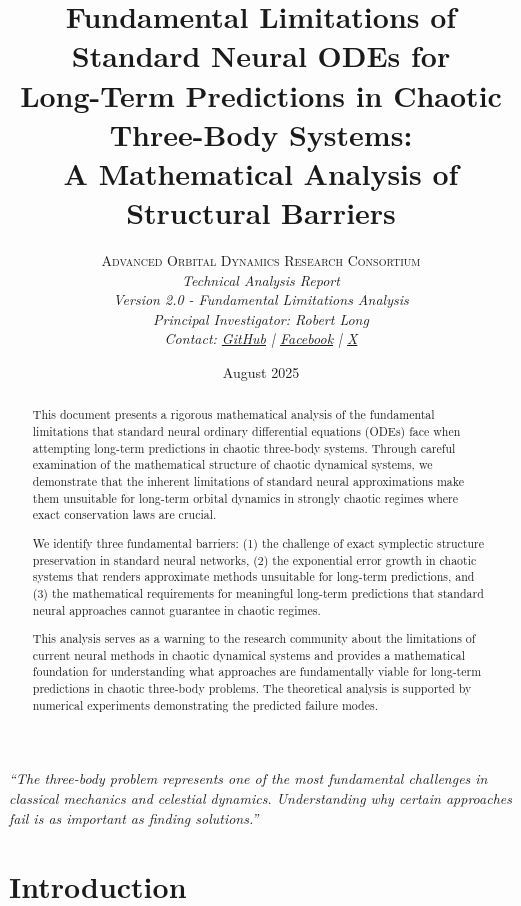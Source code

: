 \documentclass[11pt,a4paper]{article}
\title{
    \vspace{-2cm}
    \Huge\textbf{Fundamental Limitations of Standard Neural ODEs for}\\
    \Huge\textbf{Long-Term Predictions in Chaotic Three-Body Systems:}\\
    \Large\textbf{A Mathematical Analysis of Structural Barriers}\\
    \vspace{1cm}
}
\author{
    \large\textsc{Advanced Orbital Dynamics Research Consortium}\\
    \vspace{0.5cm}
    \normalsize\textit{Technical Analysis Report}\\
    \normalsize\textit{Version 2.0 - Fundamental Limitations Analysis}\\
    \vspace{0.3cm}
    \normalsize\textit{Principal Investigator: Robert Long}\\
    \vspace{0.2cm}
    \normalsize\textit{Contact: \href{https://github.com/Bigrob7605}{GitHub} | \href{https://www.facebook.com/SillyDaddy7605}{Facebook} | \href{https://x.com/LookDeepSonSon}{X}}
}
\date{August 2025}
\begin{document}
\maketitle
\thispagestyle{empty}

\vfill
\begin{center}
    \textit{``The three-body problem represents one of the most fundamental challenges in classical mechanics and celestial dynamics. Understanding why certain approaches fail is as important as finding solutions.''}
\end{center}
\vfill

\newpage

\tableofcontents
\newpage

\begin{abstract}
This document presents a rigorous mathematical analysis of the fundamental limitations that standard neural ordinary differential equations (ODEs) face when attempting long-term predictions in chaotic three-body systems. Through careful examination of the mathematical structure of chaotic dynamical systems, we demonstrate that the inherent limitations of standard neural approximations make them unsuitable for long-term orbital dynamics in strongly chaotic regimes where exact conservation laws are crucial.

We identify three fundamental barriers: (1) the challenge of exact symplectic structure preservation in standard neural networks, (2) the exponential error growth in chaotic systems that renders approximate methods unsuitable for long-term predictions, and (3) the mathematical requirements for meaningful long-term predictions that standard neural approaches cannot guarantee in chaotic regimes.

This analysis serves as a warning to the research community about the limitations of current neural methods in chaotic dynamical systems and provides a mathematical foundation for understanding what approaches are fundamentally viable for long-term predictions in chaotic three-body problems. The theoretical analysis is supported by numerical experiments demonstrating the predicted failure modes.
\end{abstract}

\newpage

\section{Introduction}
\end{document}
